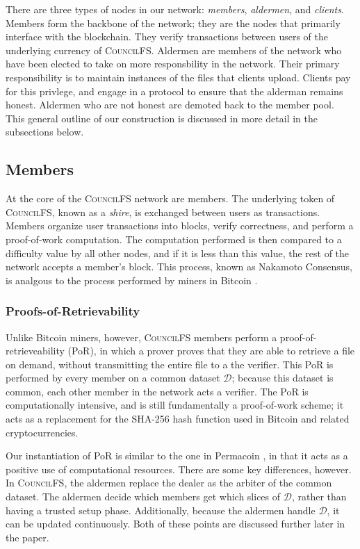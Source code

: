 \documentclass{article}
\begin{document}
There are three types of nodes in our network: \emph{members}, \emph{aldermen},
and \emph{clients}. Members form the backbone of the network; they are the nodes
that primarily interface with the blockchain. They verify transactions between
users of the underlying currency of \textsc{CouncilFS}. Aldermen are members of the
network who have been elected to take on more responsbility in the network.
Their primary responsibility is to maintain instances of the files that clients
upload. Clients pay for this privlege, and engage in a protocol to ensure that
the alderman remains honest. Aldermen who are not honest are demoted back to the
member pool. This general outline of our construction is discussed in more
detail in the subsections below.

\subsection{Members}

At the core of the \textsc{CouncilFS} network are members. The underlying token of
\textsc{CouncilFS}, known as a \emph{shire}, is exchanged between users as transactions.
Members organize user transactions into blocks, verify correctness, and perform
a proof-of-work computation. The computation performed is then compared to a
difficulty value by all other nodes, and if it is less than this value, the rest
of the network accepts a member's block. This process, known as Nakamoto
Consensus, is analgous to the process performed by miners in Bitcoin \cite{btc}.

\subsubsection{Proofs-of-Retrievability}

Unlike Bitcoin miners, however, \textsc{CouncilFS} members perform a
proof-of-retrieveability (PoR), in which a prover proves that they are able to
retrieve a file on demand, without transmitting the entire file to a the
verifier. This PoR is performed by every member on a common dataset $\mathcal{D}$; because
this dataset is common, each other member in the network acts a verifier. The
PoR is computationally intensive, and is still fundamentally a proof-of-work
scheme; it acts as a replacement for the SHA-256 hash function used in Bitcoin
and related cryptocurrencies.

Our instantiation of PoR is similar to the one in Permacoin \cite{perma}, in
that it acts as a positive use of computational resources. There are some key
differences, however. In \textsc{CouncilFS}, the aldermen replace the dealer as the
arbiter of the common dataset. The aldermen decide which members get which
slices of $\mathcal{D}$, rather than having a trusted setup phase. Additionally, because
the aldermen handle $\mathcal{D}$, it can be updated continuously. Both of these points
are discussed further later in the paper.
\end{document}
